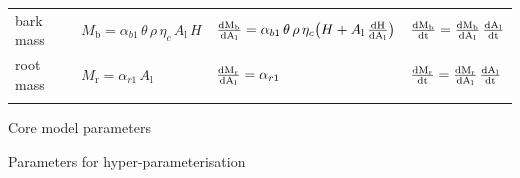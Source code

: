 \documentclass[10pt,twoside]{article}
\begin{document}
\begin{table}[h!]
\begin{tabular}{p{2.5cm}p{3.5cm}p{5cm}p{4cm} }
  bark mass &
    $M_\textrm{b} = \alpha_{b1} \, \theta \, \rho \, \eta_c \, A_\textrm{l} \, H $ &
    $\frac{\rm{d}M_\textrm{b}}{\rm{d}A_\textrm{l}} = \alpha_{b1} \, \theta \, \rho \, \eta_c\big(H + A_\textrm{l} \, \frac{\rm{d}H}{\rm{d}A_\textrm{l}} \big)$ &
    $\frac{\rm{d}M_\textrm{b}}{\rm{d}t} = \frac{\rm{d}M_\textrm{b}}{\rm{d}A_\textrm{l}} \, \frac{\rm{d}A_\textrm{l}}{\rm{d}t}$ \\
  root mass &
    $M_\textrm{r} = \alpha_{r1} \, A_\textrm{l}$ &
    $\frac{\rm{d}M_\textrm{r}}{\rm{d}A_\textrm{l}} = \alpha_{r1}$  &
    $\frac{\rm{d}M_\textrm{r}}{\rm{d}t} = \frac{\rm{d}M_\textrm{r}}{\rm{d}A_\textrm{l}} \, \frac{\rm{d}A_\textrm{l}}{\rm{d}t}$ \\
  \hline \\
\end{tabular}
\label{tab:allometry}
\end{table}

\newpage

\begin{table}[h!]
\caption{Core model parameters}

\label{tab:params_core}
\end{table}

\begin{table}[h!]
\caption{Parameters for hyper-parameterisation}

\label{tab:params_hyper}
\end{table}

\clearpage


\end{document}
